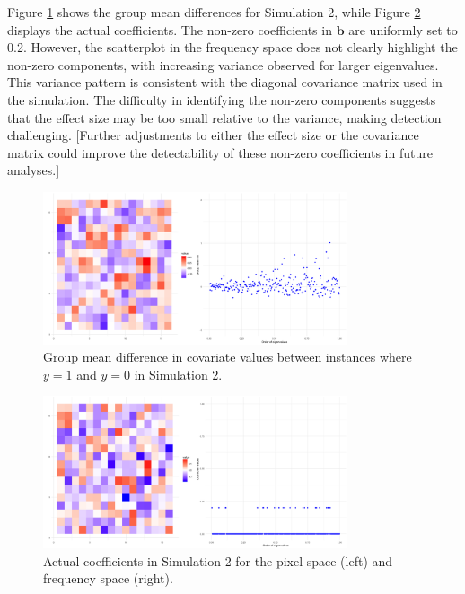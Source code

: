 \documentclass[12pt]{article}
\begin{document}
Figure \ref{fig:group_diff2} shows the group mean differences for Simulation 2, while Figure \ref{fig:coefs_sim2} displays the actual coefficients. The non-zero coefficients in \( \mathbf{b} \) are uniformly set to 0.2. However, the scatterplot in the frequency space does not clearly highlight the non-zero components, with increasing variance observed for larger eigenvalues. This variance pattern is consistent with the diagonal covariance matrix used in the simulation. The difficulty in identifying the non-zero components suggests that the effect size may be too small relative to the variance, making detection challenging. [Further adjustments to either the effect size or the covariance matrix could improve the detectability of these non-zero coefficients in future analyses.]

\begin{figure}[H]
	\centering
	\includegraphics[width=0.8\textwidth, height=0.35\textwidth]{group_mean_diff_sim2.png}
	\caption{Group mean difference in covariate values between instances where \( y = 1 \) and \( y = 0 \) in Simulation 2.}
	\label{fig:group_diff2}
\end{figure}

\begin{figure}[H]
	\centering
	\includegraphics[width=0.8\textwidth, height=0.35\textwidth]{actual_coefs_sim2.png}
	\caption{Actual coefficients in Simulation 2 for the pixel space (left) and frequency space (right).}
	\label{fig:coefs_sim2}
\end{figure}

\FloatBarrier
\end{document}
